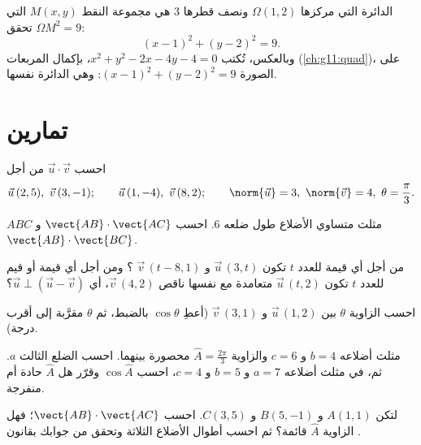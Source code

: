 \begin{example}\label{ex:g11:scal:circle}
الدائرة التي مركزها $\Omega(1, 2)$ ونصف قطرها $3$ هي مجموعة النقط
$M(x,y)$ التي تحقق $\Omega M^2 = 9$:
\[
(x - 1)^2 + (y - 2)^2 = 9 .
\]
وبالعكس، تُكتب $x^2 + y^2 - 2x - 4y - 4 = 0$، بإكمال
المربعات (\cref{ch:g11:quad})، على الصورة $(x-1)^2 + (y-2)^2 = 9$: وهي الدائرة
نفسها.
\end{example}

\section{تمارين}

\begin{exercise}[$\star$]\label{exo:g11:scal:1}
احسب $\vec u \cdot \vec v$ من أجل
\[
\vec u\,(2, 5),\ \vec v\,(3, -1); \qquad
\vec u\,(1, -4),\ \vec v\,(8, 2); \qquad
\norm{\vec u} = 3,\ \norm{\vec v} = 4,\ \theta = \frac{\pi}{3} .
\]
\end{exercise}

\begin{exercise}[$\star$]\label{exo:g11:scal:2}
$ABC$ مثلث متساوي الأضلاع طول ضلعه $6$. احسب
$\vect{AB} \cdot \vect{AC}$ و $\vect{AB} \cdot \vect{BC}$.
\end{exercise}

\begin{exercise}[$\star$]\label{exo:g11:scal:3}
من أجل أي قيمة للعدد $t$ تكون $\vec u\,(3, t)$ و $\vec v\,(t - 8, 1)$
؟ ومن أجل أي قيمة أو قيم للعدد $t$ تكون $\vec u\,(t, 2)$ متعامدة
مع نفسها ناقص $\vec v\,(4, 2)$، أي $\vec u \perp (\vec u - \vec v)$؟
\end{exercise}

\begin{exercise}[$\star$]\label{exo:g11:scal:4}
احسب الزاوية $\theta$ بين $\vec u\,(1, 2)$ و $\vec v\,(3, 1)$
(أعطِ $\cos\theta$ بالضبط، ثم $\theta$ مقرَّبة إلى أقرب درجة).
\end{exercise}

\begin{exercise}[$\star\star$]\label{exo:g11:scal:5}
مثلث أضلاعه $b = 4$ و $c = 6$ والزاوية
$\widehat A = \frac{2\pi}{3}$ محصورة بينهما. احسب الضلع الثالث $a$.
ثم، في مثلث أضلاعه $a = 7$ و $b = 5$ و $c = 4$، احسب
$\cos\widehat A$ وقرّر هل $\widehat A$ حادة أم منفرجة.
\end{exercise}

\begin{exercise}[$\star\star$]\label{exo:g11:scal:6}
لتكن $A(1, 1)$ و $B(5, -1)$ و $C(3, 5)$. احسب
$\vect{AB} \cdot \vect{AC}$؛ فهل الزاوية $\widehat A$ قائمة؟ ثم احسب
أطوال الأضلاع الثلاثة وتحقق من جوابك بقانون .
\end{exercise}

